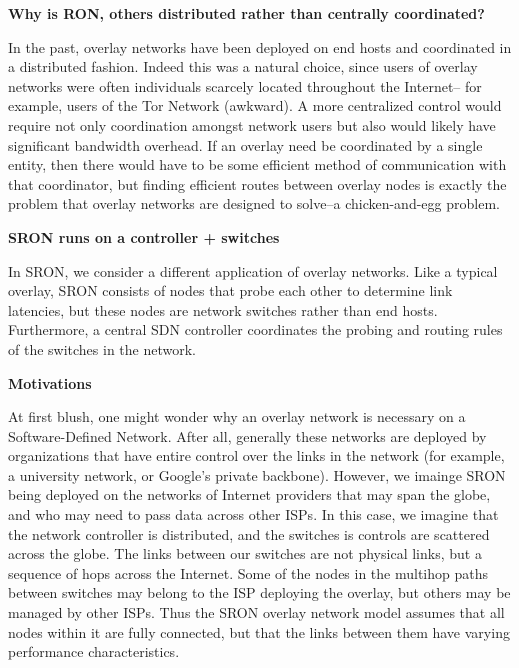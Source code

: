 \documentclass[pageno]{jpaper}
\begin{document}
{\bf Why is RON, others distributed rather than centrally coordinated?}\bigskip

In the past, overlay networks have been deployed on end hosts and coordinated 
in a distributed fashion.  Indeed this was a natural choice, since users of 
overlay networks were often individuals scarcely located throughout the Internet--
for example, users of the Tor Network (awkward).  A more centralized control
would require not only coordination amongst network users but also would likely have 
significant bandwidth overhead.  If an overlay need be coordinated by a single entity,
then there would have to be some efficient method of communication with that coordinator, but 
finding efficient routes between overlay nodes is exactly the problem that overlay networks are designed to solve--a chicken-and-egg problem.  

{\bf SRON runs on a controller + switches}\bigskip

In SRON, we consider a different application of overlay networks. Like a typical overlay,
SRON consists of nodes that probe each other to determine link latencies, but these nodes
are network switches rather than end hosts. Furthermore, a central SDN controller coordinates 
the probing and routing rules of the switches in the network. 

{\bf Motivations}\bigskip

At first blush, one might 
wonder why an overlay network is necessary on a Software-Defined Network. After all, generally
these networks are deployed by organizations that have entire control over the links in the 
network (for example, a university network, or Google's private backbone). However, we imainge
SRON being deployed on the networks of Internet providers that may span the globe, and who may
need to pass data across other ISPs. In this case, we imagine that the network controller is 
distributed, and the switches is controls are scattered across the globe. The links between 
our switches are not physical links, but a sequence of hops across the Internet. Some of the 
nodes in the multihop paths between switches may belong to the ISP deploying the overlay, 
but others may be managed by other ISPs.  Thus the SRON overlay network model assumes that all
nodes within it are fully connected, but that the links between them have varying performance 
characteristics.\bigskip
\end{document}
